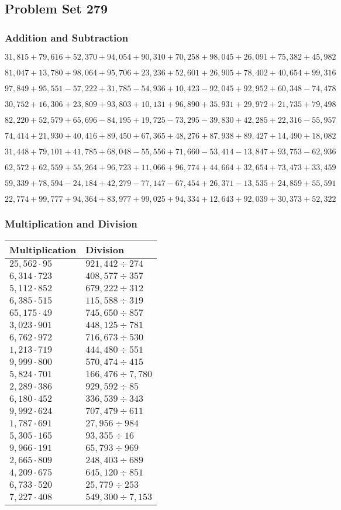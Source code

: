 \hypertarget{problem-set-279}{%
\subsection{Problem Set 279}\label{problem-set-279}}

\hypertarget{addition-and-subtraction}{%
\subsubsection{Addition and
Subtraction}\label{addition-and-subtraction}}

\(31,815+79,616+52,370+94,054+90,310+70,258+98,045+26,091+75,382+45,982\)

\(81,047+13,780+98,064+95,706+23,236+52,601+26,905+78,402+40,654+99,316\)

\(97,849+95,551-57,222+31,785-54,936+10,423-92,045+92,952+60,348-74,478\)

\(30,752+16,306+23,809+93,803+10,131+96,890+35,931+29,972+21,735+79,498\)

\(82,220+52,579+65,696-84,195+19,725-73,295-39,830+42,285+22,316-55,957\)

\(74,414+21,930+40,416+89,450+67,365+48,276+87,938+89,427+14,490+18,082\)

\(31,448+79,101+41,785+68,048-55,556+71,660-53,414-13,847+93,753-62,936\)

\(62,572+62,559+55,264+96,723+11,066+96,774+44,664+32,654+73,473+33,459\)

\(59,339+78,594-24,184+42,279-77,147-67,454+26,371-13,535+24,859+55,591\)

\(22,774+99,777+94,364+83,977+99,025+94,334+12,643+92,039+30,373+52,322\)

\hypertarget{multiplication-and-division}{%
\subsubsection{Multiplication and
Division}\label{multiplication-and-division}}

\begin{longtable}[]{@{}ll@{}}
\toprule
Multiplication & Division\tabularnewline
\midrule
\endhead
\(25,562\cdot95\) & \(921,442÷274\)\tabularnewline
\(6,314\cdot723\) & \(408,577÷357\)\tabularnewline
\(5,112\cdot852\) & \(679,222÷312\)\tabularnewline
\(6,385\cdot515\) & \(115,588 ÷319\)\tabularnewline
\(65,175\cdot49\) & \(745,650÷857\)\tabularnewline
\(3,023\cdot901\) & \(448,125÷781\)\tabularnewline
\(6,762\cdot972\) & \(716,673÷530\)\tabularnewline
\(1,213\cdot719\) & \(444,480÷551\)\tabularnewline
\(9,999\cdot800\) & \(570,474÷415\)\tabularnewline
\(5,824\cdot701\) & \(166,476÷7,780\)\tabularnewline
\(2,289\cdot386\) & \(929,592÷85\)\tabularnewline
\(6,180\cdot452\) & \(336,539÷343\)\tabularnewline
\(9,992\cdot624\) & \(707,479÷611\)\tabularnewline
\(1,787\cdot691\) & \(27,956÷984\)\tabularnewline
\(5,305\cdot165\) & \(93,355÷16\)\tabularnewline
\(9,966\cdot191\) & \(65,793÷969\)\tabularnewline
\(2,665\cdot809\) & \(248,403÷689\)\tabularnewline
\(4,209\cdot675\) & \(645,120÷851\)\tabularnewline
\(6,733\cdot520\) & \(25,779÷253\)\tabularnewline
\(7,227\cdot408\) & \(549,300÷7,153\)\tabularnewline
\bottomrule
\end{longtable}
